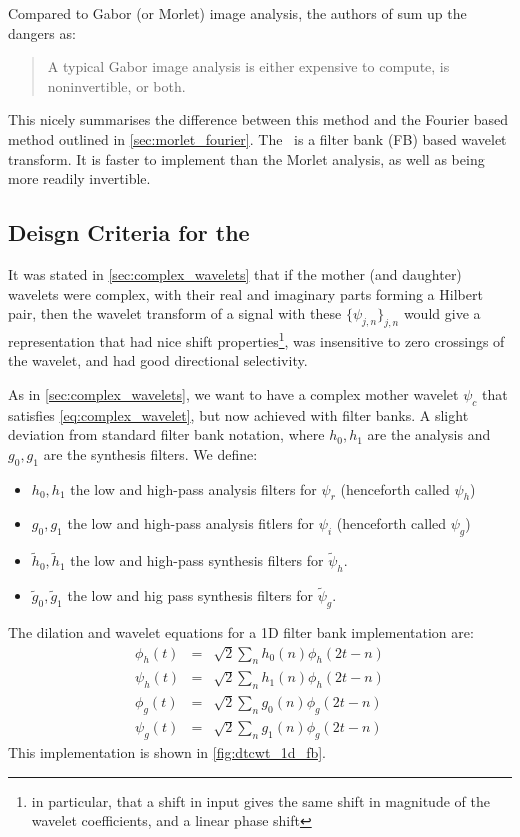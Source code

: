   Compared to Gabor (or Morlet) image analysis, the authors of
  \cite{selesnick_dual-tree_2005} sum up the dangers as:
  \begin{quote}
    A typical Gabor image analysis is either expensive to compute, is
    noninvertible, or both.
  \end{quote}
  This nicely summarises the difference between this method and the Fourier
  based method outlined in \autoref{sec:morlet_fourier}. The \DTCWT\ is
  a filter bank (FB) based wavelet transform. It is faster
  to implement than the Morlet analysis, as well as being more readily invertible.

\subsection{Deisgn Criteria for the \DTCWT}
  It was stated in
  \autoref{sec:complex_wavelets} that if the mother (and daughter) wavelets
  were complex, with their real and imaginary parts forming a Hilbert pair,
  then the wavelet transform of a signal with these $\{\psi_{j,n}\}_{j,n}$
  would give a representation that had nice shift properties\footnote{in
  particular, that a shift in input gives the same shift in magnitude of the
  wavelet coefficients, and a linear phase shift}, was insensitive to zero crossings of the
  wavelet, and had good directional selectivity. 
  
  As in \autoref{sec:complex_wavelets}, we want to have a complex mother
  wavelet $\psi_c$ that satisfies \autoref{eq:complex_wavelet}, but now
  achieved with filter banks. A slight deviation from standard filter bank
  notation, where $h_0, h_1$ are the analysis and $g_0,g_1$ are the synthesis
  filters. We define:
  \begin{itemize}
    \item $h_0, h_1$ the low and high-pass analysis filters for $\psi_r$ (henceforth called
      $\psi_h$)
    \item $g_0, g_1$ the low and high-pass analysis fitlers for $\psi_i$
      (henceforth called $\psi_g$)
    \item $\tilde{h}_0, \tilde{h}_1$ the low and high-pass synthesis filters
      for $\tilde{\psi}_h$.
    \item $\tilde{g}_0, \tilde{g}_1$ the low and hig pass synthesis filters for
      $\tilde{\psi}_g$.
  \end{itemize}

  The dilation and wavelet equations for a 1D filter bank implementation are:
  \begin{eqnarray}
    \phi_h(t) & = & \sqrt{2} \sum_n h_0(n) \phi_h(2t-n) \\
    \psi_h(t) & = & \sqrt{2} \sum_n h_1(n) \phi_h(2t-n) \\
    \phi_g(t) & = & \sqrt{2} \sum_n g_0(n) \phi_g(2t-n) \\
    \psi_g(t) & = & \sqrt{2} \sum_n g_1(n) \phi_g(2t-n) 
  \end{eqnarray}
  This implementation is shown in \autoref{fig:dtcwt_1d_fb}.

